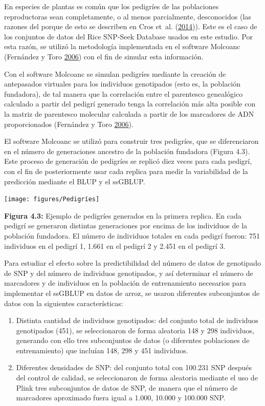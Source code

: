 \documentclass[11pt,spanish,a4paper,oneside,]{book} %
\begin{document}
En especies de plantas es común que los pedigríes de las poblaciones reproductoras sean completamente, o al menos parcialmente, desconocidos (las razones del porque de esto se describen en Cros et~al. (\protect\hyperlink{ref-cite:48}{2014})). Este es el caso de los conjuntos de datos del Rice SNP-Seek Database usados en este estudio. Por esta razón, se utilizó la metodología implementada en el software Molcoanc (Fernández y Toro \protect\hyperlink{ref-cite:24}{2006}) con el fin de simular esta información.

Con el software Molcoanc se simulan pedigríes mediante la creación de antepasados virtuales para los individuos genotipados (esto es, la población fundadora), de tal manera que la correlación entre el parentesco genealógico calculado a partir del pedigrí generado tenga la correlación más alta posible con la matriz de parentesco molecular calculada a partir de los marcadores de ADN proporcionados (Fernández y Toro \protect\hyperlink{ref-cite:24}{2006}).

El software Molcoanc se utilizó para construir tres pedigríes, que se diferenciaron en el número de generaciones ancestro de la población fundadora (Figura 4.3). Este proceso de generación de pedigríes se replicó diez veces para cada pedigrí, con el fin de posteriormente usar cada replica para medir la variabilidad de la predicción mediante el BLUP y el ssGBLUP.

\begin{center}\texttt{[image: figures/Pedigríes]} \end{center}

\noindent
\textbf{Figura 4.3:} Ejemplo de pedigríes generados en la primera replica. En cada pedigrí se generaron distintas generaciones por encima de los individuos de la población fundadora. El número de individuos totales en cada pedigrí fueron: 751 individuos en el pedigrí 1, 1.661 en el pedigrí 2 y 2.451 en el pedigrí 3.

Para estudiar el efecto sobre la predictibilidad del número de datos de genotipado de SNP y del número de individuos genotipados, y así determinar el número de marcadores y de individuos en la población de entrenamiento necesarios para implementar el ssGBLUP en datos de arroz, se usaron diferentes subconjuntos de datos con la siguientes características:

\begin{enumerate}
\def\labelenumi{\arabic{enumi}.}
\item
  Distinta cantidad de individuos genotipados: del conjunto total de individuos genotipados (451), se seleccionaron de forma aleatoria 148 y 298 individuos, generando con ello tres subconjuntos de datos (o diferentes poblaciones de entrenamiento) que incluían 148, 298 y 451 individuos.
\item
  Diferentes densidades de SNP: del conjunto total con 100.231 SNP después del control de calidad, se seleccionaron de forma aleatoria mediante el uso de Plink tres subconjuntos de datos de SNP, de manera que el número de marcadores aproximado fuera igual a 1.000, 10.000 y 100.000 SNP.
\end{enumerate}
\end{document}
